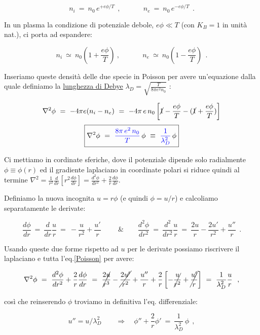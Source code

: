 \[n_i\ =\ n_0\, e^{+e\phi/T}\ \ ,\, \quad \quad \quad n_e\ =\ n_0\, e^{-e\phi/T}\ \ .\] 

In un plasma la condizione di potenziale debole, $e\phi\ll T$ (con $K_B=1$ in unità nat.), ci porta ad espandere: 

\[n_i\ \simeq\ n_0\left(1+\frac{e\phi}{T}\right)\ , \, \quad \quad \quad n_e\ \simeq\  n_0\left(1-\frac{e\phi}{T}\right)\ \ .\]

Inseriamo queste densità delle due specie in Poisson per avere un'equazione dalla quale definiamo la \underline{lunghezza di Debye} $\lambda_D = \sqrt{\displaystyle\frac{T}{8\pi e^2 n_0}}$ :

\[ \nabla^2 \phi\ =\ -4\pi e (n_i - n_e)\ =\ -4\pi\, e\,n_0 \left[ \cancel{1} - \frac{e\phi}{T}- (\cancel{1} + \frac{e\phi}{T}) \right]
\]
\begin{equation}\label{Poisson}
	\boxed{\nabla^2 \phi\ =\ \color{blue}{\frac{8\pi \, e^2\, n_0}{T}} \color{black}\, \phi \ \equiv \ \color{blue}\frac{1}{\lambda_D^2} \color{black}\,\phi}
\end{equation}

Ci mettiamo in cordinate sferiche, dove il potenziale dipende solo radialmente $\phi \equiv \phi(r)$ ed il gradiente laplaciano in coordinate polari si riduce quindi al termine $\nabla^2= \displaystyle\frac{1}{r^2} \frac{d}{dr} \left[ r^2 \frac{d\phi}{dr} \right] = \frac{d^2\phi}{dr^2} + \frac{2}{r} \frac{d\phi}{dr}$.

Definiamo la nuova incognita $u=r\phi$ (e quindi $\phi = u/r$) e calcoliamo separatamente le derivate:

\[\frac{d\phi}{dr}\ =\ \frac{d}{dr}\frac{u}{r}\ =\  -\frac{u}{r^2} + \frac{u'}{r}\ \, \quad \quad \&
\quad \quad \frac{d^2\phi}{dr^2} \ =\ \frac{d^2}{dr^2}\frac{u}{r}\ =\ \frac{2u}{r}-\frac{2u'}{r^2} + \frac{u''}{r}\ \ .\]

Usando queste due forme rispetto ad $u$ per le derivate possiamo riscrivere il laplaciano e tutta l'eq.\ref{Poisson} per avere:

\[\nabla^2 \phi\ =\ \frac{d^2\phi}{dr^2} + \frac{2}{r} \frac{d\phi}{dr}\ =\ \cancel{\frac{2u}{r^3}} - \cancel{\frac{2u'}{r^2}} + \frac{u''}{r} + \frac{2}{r} \left[ -\cancel{\frac{u}{r^2}} + \cancel{\frac{u'}{r} }  \right] \ =\ \frac{1}{\lambda^2_D} \frac{u}{r}\ \ , \]

così che reinserendo $\phi$ troviamo in definitiva l'eq. differenziale:

\begin{equation}
	u''= u/\lambda_D^2 \quad \quad \Rightarrow \quad \phi'' + \frac{2}{r}\phi'\ =\ \frac{1}{\lambda^2_D}\, \phi\ \ ,
\end{equation}


